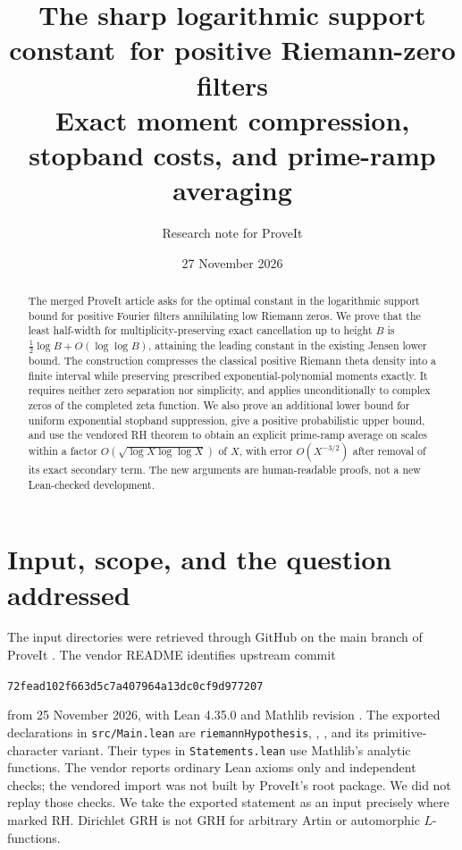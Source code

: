\documentclass[11pt]{article}
\title{The sharp logarithmic support constant\ for positive Riemann-zero filters\\[4pt]\large Exact moment compression, stopband costs, and prime-ramp averaging}
\author{Research note for ProveIt}
\date{27 November 2026}
\theoremstyle{remark}\newtheorem{remark}[theorem]{Remark}
\begin{document}
\maketitle
\begin{abstract}
The merged ProveIt article asks for the optimal constant in the logarithmic support bound for positive Fourier filters annihilating low Riemann zeros. We prove that the least half-width for multiplicity-preserving exact cancellation up to height $B$ is $\frac12\log B+O(\log\log B)$, attaining the leading constant in the existing Jensen lower bound. The construction compresses the classical positive Riemann theta density into a finite interval while preserving prescribed exponential-polynomial moments exactly. It requires neither zero separation nor simplicity, and applies unconditionally to complex zeros of the completed zeta function. We also prove an additional lower bound for uniform exponential stopband suppression, give a positive probabilistic upper bound, and use the vendored RH theorem to obtain an explicit prime-ramp average on scales within a factor $O(\sqrt{\log X\log\log X})$ of $X$, with error $O(X^{-3/2})$ after removal of its exact secondary term. The new arguments are human-readable proofs, not a new Lean-checked development.
\end{abstract}

\section{Input, scope, and the question addressed}
\label{sec:input}
The input directories were retrieved through GitHub on the main branch of ProveIt \cite{vendor,article}. The vendor README identifies upstream commit
\begin{center}\small\texttt{72fead102f663d5c7a407964a13dc0cf9d977207}\end{center}
from 25 November 2026, with Lean 4.35.0 and Mathlib revision . The exported declarations in \texttt{src/Main.lean} are \texttt{riemannHypothesis}, , ,  and its primitive-character variant. Their types in \texttt{Statements.lean} use Mathlib's analytic functions. The vendor reports ordinary Lean axioms only and independent checks; the vendored import was not built by ProveIt's root package. We did not replay those checks. We take the exported statement as an input precisely where marked RH. Dirichlet GRH is not GRH for arbitrary Artin or automorphic $L$-functions.
\end{document}
